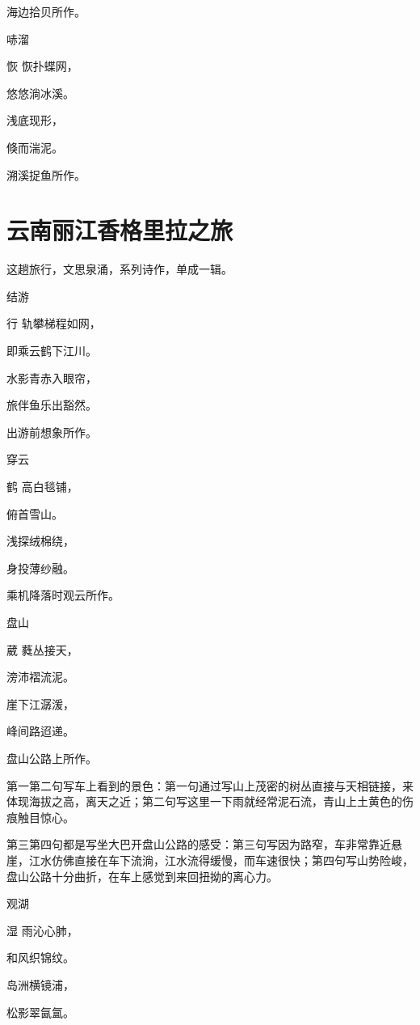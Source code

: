 \documentclass{article}
\newenvironment{poem}[3]{
\begin{minipage}{\textwidth}
\begin{pinyinscope}\begin{center}\Large\linespread{1.4}\selectfont #2\end{center}\end{pinyinscope}
\begin{pinyinscope}
	\begin{center}
	\Large\linespread{1.4}\rmfamily\selectfont #3
}{\end{center}
\end{pinyinscope}
\end{minipage}
}
\begin{document}
海边拾贝所作。

\begin{poem}{}{哧溜}
恢恢扑蝶网，

悠悠淌冰溪。

浅底现形{}，

倏而{}湍泥。
\end{poem}

溯溪捉鱼所作。

\section{云南丽江香格里拉之旅}

这趟旅行，文思泉涌，系列诗作，单成一辑。

\begin{poem}{}{结游}
行轨攀梯程如网，

即乘云鹤下江川。

水影青赤入眼帘，

旅伴鱼乐出豁然。
\end{poem}

出游前想象所作。

\bigbreak

\begin{poem}{}{穿云}
鹤高白毯铺，

俯首雪山{}。

浅探绒棉绕，

身投薄纱融。
\end{poem}

乘机降落时观云所作。

\bigbreak

\begin{poem}{}{盘山}
葳蕤丛接天，

滂沛褶流泥。

崖下江潺{\textsf 湲}，

峰间路迢递。
\end{poem}

盘山公路上所作。

第一第二句写车上看到的景色：第一句通过写山上茂密的树丛直接与天相链接，来体现海拔之高，离天之近；第二句写这里一下雨就经常泥石流，青山上土黄色的伤痕触目惊心。

第三第四句都是写坐大巴开盘山公路的感受：第三句写因为路窄，车非常靠近悬崖，江水仿佛直接在车下流淌，江水流得缓慢，而车速很快；第四句写山势险峻，盘山公路十分曲折，在车上感觉到来回扭拗的离心力。

\bigbreak

\begin{poem}{}{观湖}
湿雨沁心肺，

和风织锦纹。

岛洲横镜浦，

松影翠氤氲。
\end{poem}
\end{document}
